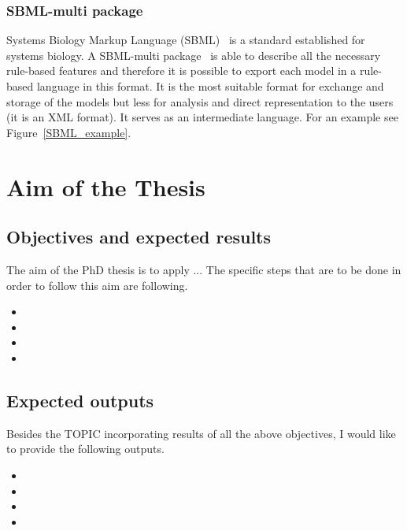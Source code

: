 \documentclass[11pt,a4paper]{report}
\begin{document}
\subsection{SBML-multi package}

Systems Biology Markup Language (SBML)~\cite{hucka2003systems} is a standard established for systems biology. A SBML-multi package~\cite{zhang2015sbml} is able to describe all the necessary rule-based features and therefore it is possible to export each model in a rule-based language in this format. It is the most suitable format for exchange and storage of the models but less for analysis and direct representation to the users (it is an XML format). It serves as an intermediate language. For an example see Figure~\ref{SBML_example}.


\chapter{Aim of the Thesis} \label{chap:aim}

\section{Objectives and expected results}

The aim of the PhD thesis is to apply ...
The specific steps that are to be done in order to follow this aim are
following.
\begin{itemize}
\item 
\item 
\item 
\item
\end{itemize}

\section{Expected outputs}
Besides the TOPIC incorporating results of
all the above objectives, I would like to provide the following outputs.
\begin{itemize}
\item 
\item 
\item
\item 
\end{itemize}
\end{document}
